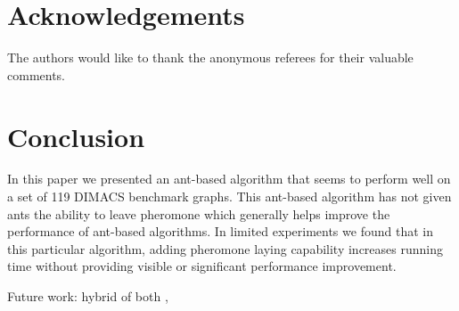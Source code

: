 \documentclass[11pt]{article}
\begin{document}
\begin{table}[ht!]
\begin{footnotesize}
\begin{center}
\begin{tabular}{|l||c|cc|c||c|cc|c|}
\hline
\end{tabular}
\end{center}
\end{footnotesize}
\end{table}


\section{Acknowledgements}

The authors would like to thank the anonymous referees for their valuable comments.

\section{Conclusion}\label{conclusion}
  
In this paper we presented an ant-based algorithm that seems to perform well
on a set of 119 DIMACS benchmark graphs.  This ant-based algorithm has not given ants
the ability to leave pheromone which generally helps improve the performance
of ant-based algorithms.  In limited experiments we found that in this
particular algorithm, adding pheromone laying capability increases
running time without providing visible or significant performance
improvement. 

Future work: hybrid of both , 





\end{document}
